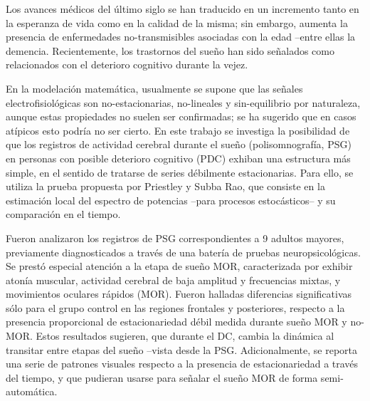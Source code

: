 \documentclass[12pt,a4paper]{mitthesis}
\begin{document}
{\small

Los avances m\'edicos del \'ultimo siglo se han traducido en un incremento tanto en la esperanza
de vida como en la calidad de la misma; sin embargo, aumenta la presencia de enfermedades 
no-transmisibles asociadas con la edad --entre ellas la demencia.
Recientemente, los trastornos del sue\~no han sido se\~nalados como relacionados con el deterioro 
cognitivo durante la vejez.

En la modelaci\'on matem\'atica, usualmente se supone que las se\~nales electrofisiol\'ogicas son 
no-estacionarias, no-lineales y sin-equilibrio por naturaleza, aunque estas propiedades no suelen 
ser confirmadas; se ha sugerido que en casos at\'ipicos esto podr\'ia no ser cierto.
En este trabajo se investiga la posibilidad de que los registros de actividad cerebral durante el 
sue\~no (polisomnograf\'ia, PSG) en personas con posible deterioro cognitivo (PDC) exhiban una 
estructura m\'as simple, en el sentido de tratarse de series d\'ebilmente estacionarias.
Para ello, se utiliza la prueba propuesta por Priestley y Subba Rao,
que consiste en la estimaci\'on local del espectro de potencias --para procesos estoc\'asticos-- y 
su comparaci\'on en el tiempo.

Fueron analizaron los registros de PSG correspondientes a 9 adultos mayores, previamente 
diagnosticados a trav\'es de una bater\'ia de pruebas neuropsicol\'ogicas.
Se prest\'o especial atenci\'on a la etapa de sue\~no MOR, caracterizada por exhibir aton\'ia
muscular, actividad cerebral de baja amplitud y frecuencias mixtas, y movimientos oculares r\'apidos
(MOR).
Fueron halladas diferencias significativas s\'olo para el grupo control en las regiones frontales y 
posteriores, respecto a la presencia proporcional de estacionariedad d\'ebil medida durante sue\~no 
MOR y no-MOR.
Estos resultados sugieren, que durante el DC, cambia la din\'amica al transitar entre etapas 
del sue\~no --vista desde la PSG. 
Adicionalmente, se reporta una serie de patrones visuales respecto a la presencia de 
estacionariedad a trav\'es del tiempo, y que pudieran usarse para se\~nalar el sue\~no MOR de forma 
semi-autom\'atica.%

}
\end{document}
